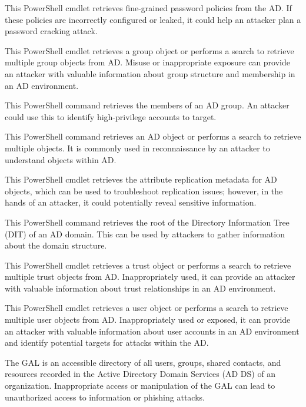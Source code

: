  This PowerShell cmdlet retrieves fine-grained password policies from the AD. If these policies are incorrectly configured or leaked, it could help an attacker plan a password cracking attack.

 This PowerShell cmdlet retrieves a group object or performs a search to retrieve multiple group objects from AD. Misuse or inappropriate exposure can provide an attacker with valuable information about group structure and membership in an AD environment.

 This PowerShell command retrieves the members of an AD group. An attacker could use this to identify high-privilege accounts to target.

 This PowerShell command retrieves an AD object or performs a search to retrieve multiple objects. It is commonly used in reconnaissance by an attacker to understand objects within AD.

 This PowerShell cmdlet retrieves the attribute replication metadata for AD objects, which can be used to troubleshoot replication issues; however, in the hands of an attacker, it could potentially reveal sensitive information.

 This PowerShell command retrieves the root of the Directory Information Tree (DIT) of an AD domain. This can be used by attackers to gather information about the domain structure.

 This PowerShell cmdlet retrieves a trust object or performs a search to retrieve multiple trust objects from AD. Inappropriately used, it can provide an attacker with valuable information about trust relationships in an AD environment.

 This PowerShell cmdlet retrieves a user object or performs a search to retrieve multiple user objects from AD. Inappropriately used or exposed, it can provide an attacker with valuable information about user accounts in an AD environment and identify potential targets for attacks within the AD.

 The GAL is an accessible directory of all users, groups, shared contacts, and resources recorded in the Active Directory Domain Services (AD DS) of an organization. Inappropriate access or manipulation of the GAL can lead to unauthorized access to information or phishing attacks.

